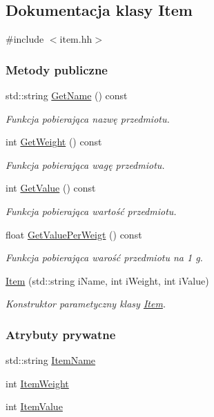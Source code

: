 \hypertarget{class_item}{\subsection{Dokumentacja klasy Item}
\label{class_item}
}


{\ttfamily \#include $<$item.\-hh$>$}

\subsubsection*{Metody publiczne}
\begin{DoxyCompactItemize}
\item 
std\-::string \hyperlink{class_item_a97d9d20c9b42b9696be110c14897858c}{Get\-Name} () const 
\begin{DoxyCompactList}\small\item\em Funkcja pobierająca nazwę przedmiotu. \end{DoxyCompactList}\item 
int \hyperlink{class_item_a894a58fc7e4f82071babddc460a650b9}{Get\-Weight} () const 
\begin{DoxyCompactList}\small\item\em Funkcja pobierająca wagę przedmiotu. \end{DoxyCompactList}\item 
int \hyperlink{class_item_a0ccf2b4569f86a0c2ee55651042e581f}{Get\-Value} () const 
\begin{DoxyCompactList}\small\item\em Funkcja pobierająca wartość przedmiotu. \end{DoxyCompactList}\item 
float \hyperlink{class_item_a704556451d8c68a1c9c10d16fb407d56}{Get\-Value\-Per\-Weigt} () const 
\begin{DoxyCompactList}\small\item\em Funkcja pobierająca warość przedmiotu na 1 g. \end{DoxyCompactList}\item 
\hyperlink{class_item_a014bd03374db1413e4e154a6b82dadbb}{Item} (std\-::string i\-Name, int i\-Weight, int i\-Value)
\begin{DoxyCompactList}\small\item\em Konstruktor parametyczny klasy \hyperlink{class_item}{Item}. \end{DoxyCompactList}\end{DoxyCompactItemize}
\subsubsection*{Atrybuty prywatne}
\begin{DoxyCompactItemize}
\item 
std\-::string \hyperlink{class_item_a7d8799886dca624982c8af6887adf916}{Item\-Name}
\item 
int \hyperlink{class_item_ad7b5016b5e5b378559b138dea750d92b}{Item\-Weight}
\item 
int \hyperlink{class_item_ac6060c04d812737e6a0b57d593c6be98}{Item\-Value}
\end{DoxyCompactItemize}


